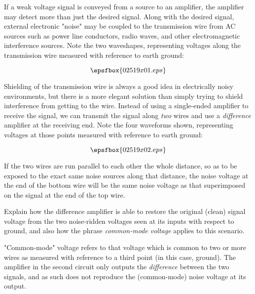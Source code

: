 

If a weak voltage signal is conveyed from a source to an amplifier, the amplifier may detect more than just the desired signal.  Along with the desired signal, external electronic "noise" may be coupled to the transmission wire from AC sources such as power line conductors, radio waves, and other electromagnetic interference sources.  Note the two waveshapes, representing voltages along the transmission wire measured with reference to earth ground:

$$\epsfbox{02519x01.eps}$$

Shielding of the transmission wire is always a good idea in electrically noisy environments, but there is a more elegant solution than simply trying to shield interference from getting to the wire.  Instead of using a single-ended amplifier to receive the signal, we can transmit the signal along {\it two} wires and use a {\it difference} amplifier at the receiving end.  Note the four waveforms shown, representing voltages at those points measured with reference to earth ground:

$$\epsfbox{02519x02.eps}$$

If the two wires are run parallel to each other the whole distance, so as to be exposed to the exact same noise sources along that distance, the noise voltage at the end of the bottom wire will be the same noise voltage as that superimposed on the signal at the end of the top wire.

Explain how the difference amplifier is able to restore the original (clean) signal voltage from the two noise-ridden voltages seen at its inputs with respect to ground, and also how the phrase {\it common-mode voltage} applies to this scenario.







"Common-mode" voltage refers to that voltage which is common to two or more wires as measured with reference to a third point (in this case, ground).  The amplifier in the second circuit only outputs the {\it difference} between the two signals, and as such does not reproduce the (common-mode) noise voltage at its output.


